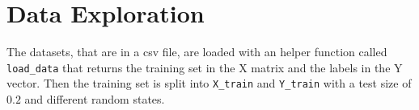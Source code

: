 \documentclass{article}
\begin{document}
\section{Data Exploration}
The datasets, that are in a csv file, are loaded with an helper function called \texttt{load\_data} that returns the training set in the X matrix and the labels in the Y vector.
\newline
\newline
Then the training set is split into \texttt{X\_train} and \texttt{Y\_train} with a test size of $0.2$ and different random states.
\end{document}
